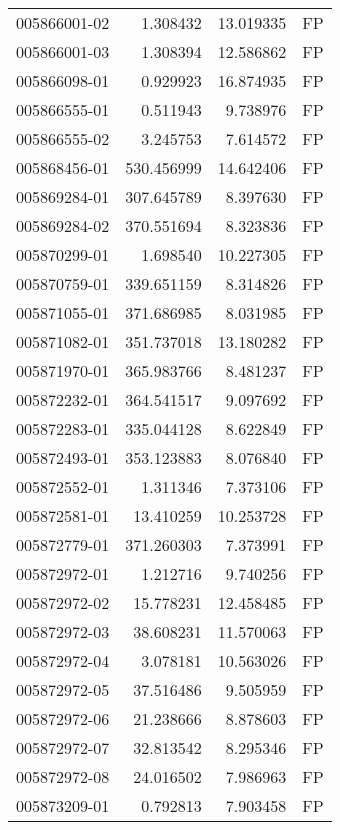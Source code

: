 \begin{tabular}{lrrl}
005866001-02 &    1.308432 &      13.019335 &   FP \\
005866001-03 &    1.308394 &      12.586862 &   FP \\
005866098-01 &    0.929923 &      16.874935 &   FP \\
005866555-01 &    0.511943 &       9.738976 &   FP \\
005866555-02 &    3.245753 &       7.614572 &   FP \\
005868456-01 &  530.456999 &      14.642406 &   FP \\
005869284-01 &  307.645789 &       8.397630 &   FP \\
005869284-02 &  370.551694 &       8.323836 &   FP \\
005870299-01 &    1.698540 &      10.227305 &   FP \\
005870759-01 &  339.651159 &       8.314826 &   FP \\
005871055-01 &  371.686985 &       8.031985 &   FP \\
005871082-01 &  351.737018 &      13.180282 &   FP \\
005871970-01 &  365.983766 &       8.481237 &   FP \\
005872232-01 &  364.541517 &       9.097692 &   FP \\
005872283-01 &  335.044128 &       8.622849 &   FP \\
005872493-01 &  353.123883 &       8.076840 &   FP \\
005872552-01 &    1.311346 &       7.373106 &   FP \\
005872581-01 &   13.410259 &      10.253728 &   FP \\
005872779-01 &  371.260303 &       7.373991 &   FP \\
005872972-01 &    1.212716 &       9.740256 &   FP \\
005872972-02 &   15.778231 &      12.458485 &   FP \\
005872972-03 &   38.608231 &      11.570063 &   FP \\
005872972-04 &    3.078181 &      10.563026 &   FP \\
005872972-05 &   37.516486 &       9.505959 &   FP \\
005872972-06 &   21.238666 &       8.878603 &   FP \\
005872972-07 &   32.813542 &       8.295346 &   FP \\
005872972-08 &   24.016502 &       7.986963 &   FP \\
005873209-01 &    0.792813 &       7.903458 &   FP \\

\end{tabular}
